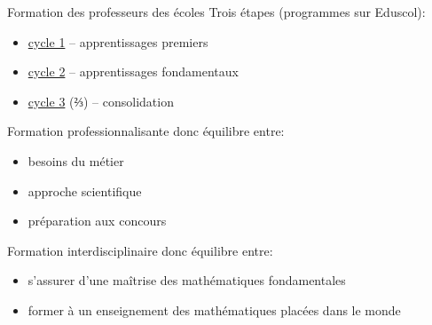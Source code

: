\documentclass[
  french,
  ignorenonframetext,
]{beamer}
\providecommand{\tightlist}{%
  \setlength{\itemsep}{0pt}\setlength{\parskip}{0pt}}
\begin{document}
\begin{frame}{Formation des professeurs des écoles}
\protect\hypertarget{formation-des-professeurs-des-uxe9coles}{}
Trois étapes (programmes sur Eduscol):

\begin{itemize}
\tightlist
\item
  \href{https://eduscol.education.fr/pid33040/programme-ressources-et-evaluation.html}{cycle
  1} -- apprentissages premiers
\item
  \href{https://eduscol.education.fr/pid34139/cycle-2-ecole-elementaire.html}{cycle
  2} -- apprentissages fondamentaux
\item
  \href{https://eduscol.education.fr/pid34150/cycle-3-ecole-elementaire-college.html}{cycle
  3} (\(⅔\)) -- consolidation
\end{itemize}

Formation professionnalisante donc équilibre entre:

\begin{itemize}
\tightlist
\item
  besoins du métier
\item
  approche scientifique
\item
  préparation aux concours
\end{itemize}

Formation interdisciplinaire donc équilibre entre:

\begin{itemize}
\tightlist
\item
  s'assurer d'une maîtrise des mathématiques fondamentales
\item
  former à un enseignement des mathématiques placées dans le monde
\end{itemize}
\end{frame}
\end{document}
